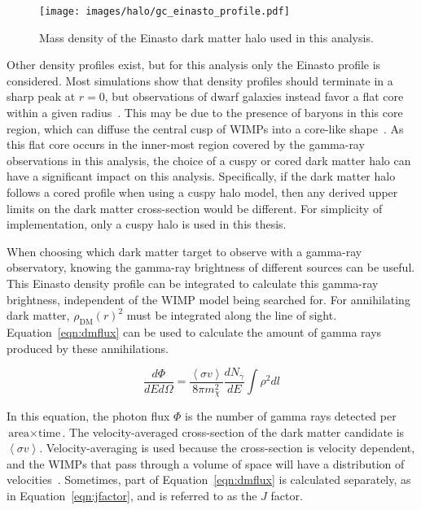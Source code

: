     \begin{figure}[ht]
      \centering
      \texttt{[image: images/halo/gc\_einasto\_profile.pdf]}
      \caption[Galactic Center Einasto Halo Density]{
        Mass density of the Einasto dark matter halo used in this analysis.
        \CaptionBlankLine
        }
      \label{fig:gchalo_density}
    \end{figure}

    Other density profiles exist, but for this analysis only the Einasto profile is considered.
    Most simulations show that density profiles should terminate in a sharp peak at $r=0$, but observations of dwarf galaxies instead favor a flat core within a given radius~\cite{flores1994observational,CoreVsCusp}.
    This may be due to the presence of baryons in this core region, which can diffuse the central cusp of WIMPs into a core-like shape~\cite{corecusp_baryondiffuse1,corecusp_baryondiffuse2}.
    As this flat core occurs in the inner-most region covered by the gamma-ray observations in this analysis, the choice of a cuspy or cored dark matter halo can have a significant impact on this analysis.
    Specifically, if the dark matter halo follows a cored profile when using a cuspy halo model, then any derived upper limits on the dark matter cross-section would be different.
    For simplicity of implementation, only a cuspy halo is used in this thesis.
    
    When choosing which dark matter target to observe with a gamma-ray observatory, knowing the gamma-ray brightness of different sources can be useful.
    This Einasto density profile can be integrated to calculate this gamma-ray brightness, independent of the WIMP model being searched for.
    For annihilating dark matter, $\rho_{\textrm{DM}}\left(r\right)^2$ must be integrated along the line of sight.
    Equation~\ref{eqn:dmflux} can be used to calculate the amount of gamma rays produced by these annihilations.
    
    \begin{equation}\label{eqn:dmflux}
      \frac{ d\Phi }{ dE d \Omega } = \frac{ \left \langle \sigma v \right \rangle }{8 \pi m_\chi^2} \frac{dN_{\gamma}}{dE} \int \rho^2 dl
    \end{equation}
    
    In this equation, the photon flux $\Phi$ is the number of gamma rays detected per $\textrm{area}\times\textrm{time}$.
    The velocity-averaged cross-section of the dark matter candidate is $\left \langle \sigma v \right \rangle$.
    Velocity-averaging is used because the cross-section is velocity dependent, and the WIMPs that pass through a volume of space will have a distribution of velocities~\cite{wimp_veldist}.
    Sometimes, part of Equation~\ref{eqn:dmflux} is calculated separately, as in Equation~\ref{eqn:jfactor}, and is referred to as the $J$ factor.

